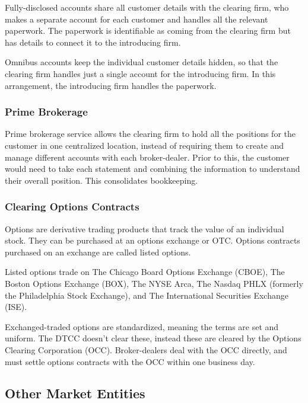 Fully-disclosed accounts share all customer details with the clearing firm, who makes a separate account for each customer and handles all the relevant paperwork. The paperwork is identifiable as coming from the clearing firm but has details to connect it to the introducing firm. 

Omnibus accounts keep the individual customer details hidden, so that the clearing firm handles just a single account for the introducing firm. In this arrangement, the introducing firm handles the paperwork. 

\medskip

\subsubsection{Prime Brokerage}

Prime brokerage service allows the clearing firm to hold all the positions for the customer in one centralized location, instead of requiring them to create and manage different accounts with each broker-dealer. Prior to this, the customer would need to take each statement and combining the information to understand their overall position. This consolidates bookkeeping. 

\medskip

\subsubsection{Clearing Options Contracts}

Options are derivative trading products that track the value of an individual stock. They can be purchased at an options exchange or OTC. Options contracts purchased on an exchange are called listed options.   

Listed options trade on The Chicago Board Options Exchange (CBOE), The Boston Options Exchange (BOX), The NYSE Arca, The Nasdaq PHLX (formerly the Philadelphia Stock Exchange), and The International Securities Exchange (ISE).

Exchanged-traded options are standardized, meaning the terms are set and uniform. The DTCC doesn't clear these, instead these are cleared by the Options Clearing Corporation (OCC). Broker-dealers deal with the OCC directly, and must settle options contracts with the OCC within one business day. 

\bigskip

\subsection{Other Market Entities}

